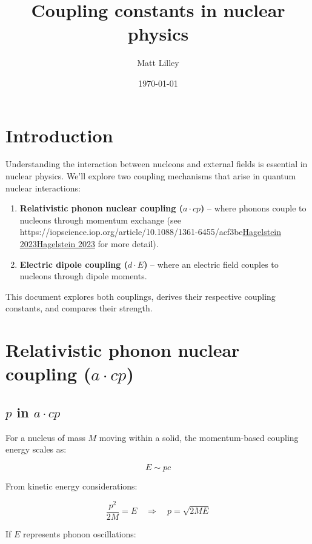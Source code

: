 \documentclass[
]{article}
\title{Coupling constants in nuclear physics}
\author{Matt Lilley}
\date{\today}  %
\let\oldhref\href
\renewcommand{\href}[2]{\ifx#1\urlprefix\oldhref{#1}{#2}\else\uline{\oldhref{#1}{#2}}\fi}
\renewcommand{\[}{\begin{equation}}
\renewcommand{\]}{\end{equation}}
\providecommand{\tightlist}{%
  \setlength{\itemsep}{0pt}\setlength{\parskip}{0pt}}
\begin{document}
\maketitle

\section{Introduction}\label{introduction}

Understanding the interaction between nucleons and external fields is
essential in nuclear physics. We'll explore two coupling mechanisms that
arise in quantum nuclear interactions:

\begin{enumerate}
\def\labelenumi{\arabic{enumi}.}
\tightlist
\item
  \textbf{Relativistic phonon nuclear coupling (\(a \cdot cp\))} --
  where phonons couple to nucleons through momentum exchange (see
  \href{https://iopscience.iop.org/article/10.1088/1361-6455/acf3be}{Hagelstein
  2023} for more detail).
\item
  \textbf{Electric dipole coupling (\(d \cdot E\))} -- where an electric
  field couples to nucleons through dipole moments.
\end{enumerate}

This document explores both couplings, derives their respective coupling
constants, and compares their strength.

\section{\texorpdfstring{Relativistic phonon nuclear coupling
(\(a \cdot cp\))}{Relativistic phonon nuclear coupling (a \textbackslash cdot cp)}}\label{relativistic-phonon-nuclear-coupling-a-cdot-cp}

\subsection{\texorpdfstring{\(p\) in
\(a \cdot cp\)}{p in a \textbackslash cdot cp}}\label{p-in-a-cdot-cp}

For a nucleus of mass \(M\) moving within a solid, the momentum-based
coupling energy scales as:

\[
E \sim p c 
\]

From kinetic energy considerations:

\[
\frac{p^2}{2M} = E \quad \Rightarrow \quad p = \sqrt{2ME}
\]

If \(E\) represents phonon oscillations:
\end{document}
